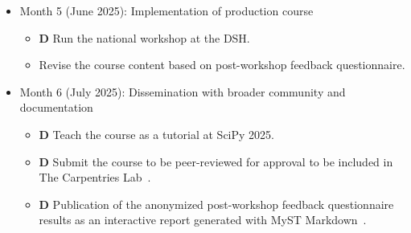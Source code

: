 \documentclass[letterpaper, 11pt]{article}
\newcommand{\deliverable}{\textbf{\textrm{D}}}
\begin{document}
\begin{itemize}
\begin{itemize}
    \end{itemize}
  \item Month 5 (June 2025): Implementation of production course
    \begin{itemize}
      \item \deliverable{} Run the national workshop at the DSH.
      \item Revise the course content based on post-workshop feedback questionnaire.
    \end{itemize}
  \item Month 6 (July 2025): Dissemination with broader community and documentation
    \begin{itemize}
      \item \deliverable{} Teach the course as a tutorial at SciPy 2025.
      \item \deliverable{} Submit the course to be peer-reviewed for approval to be included in The Carpentries Lab~\cite{carpentries_lab}.
      \item \deliverable{} Publication of the anonymized post-workshop feedback questionnaire results as an interactive report generated with MyST Markdown~\cite{executable_books_community}.
    \end{itemize}
\end{itemize}

%
\vspace*{-0.25cm}
\begin{footnotesize}
%
 
 
%
\end{footnotesize}
\end{document}
